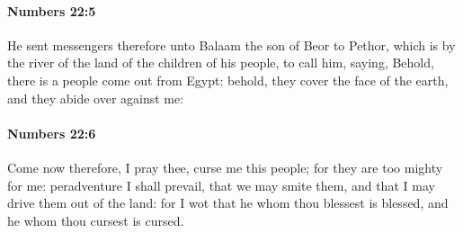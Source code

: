 		\paragraph{Numbers 22:5} %
			\label{NUMBERS-22-5}

			He sent messengers therefore unto Balaam the son of Beor to Pethor, which is by the river of the land of the children of his people, to call him, saying, Behold, there is a people come out from Egypt: behold, they cover the face of the earth, and they abide over against me:


		\paragraph{Numbers 22:6} %
			\label{NUMBERS-22-6}

			Come now therefore, I pray thee, curse me this people; for they are too mighty for me: peradventure I shall prevail, that we may smite them, and that I may drive them out of the land: for I wot that he whom thou blessest is blessed, and he whom thou cursest is cursed.

